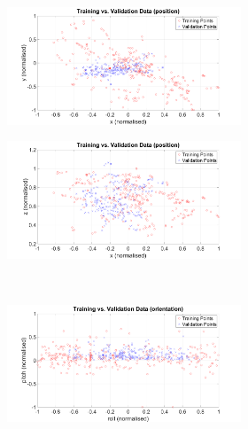 \begin{figure}
  \centering
  \begin{subfigure}{\textwidth}
    \begin{subfigure}{0.48\textwidth}
      \includegraphics[clip, trim = 80 0 80 0, width=\textwidth]{figures/chapter4/trv_xy}
    \end{subfigure}
    \begin{subfigure}{0.48\textwidth}
      \includegraphics[clip, trim = 80 0 80 0, width=\textwidth]{figures/chapter4/trv_xz}
    \end{subfigure}
    \caption{}
  \end{subfigure}
  ~
  \begin{subfigure}{\textwidth}
    \begin{subfigure}{0.48\textwidth}
      \includegraphics[clip, trim = 80 0 80 0, width=\textwidth]{figures/chapter4/trv_rollpitch}

\end{subfigure}
\end{subfigure}
\end{figure}
